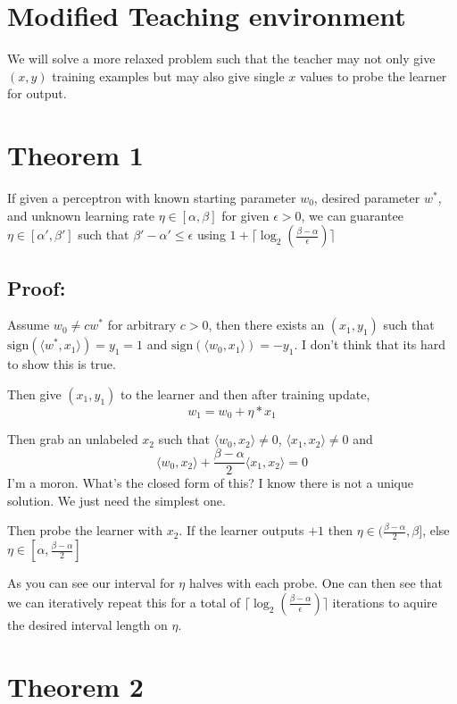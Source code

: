 \documentclass{article}
\begin{document}
\section*{Modified Teaching environment}
We will solve a more relaxed problem such that the teacher may not only give $(x,y)$ training examples but may also give single $x$ values to probe the learner for output. 

\section*{Theorem 1}
If given a perceptron with known starting parameter $w_0$, desired parameter $w^*$, and unknown learning rate $\eta \in [\alpha , \beta]$ for given $\epsilon > 0$, we can guarantee $\eta \in [\alpha', \beta']$ such that $\beta' - \alpha' \leq \epsilon$ using $1 + \lceil \log_2(\frac{\beta - \alpha}{\epsilon})\rceil$

\subsection*{Proof:}
Assume $w_0 \neq cw^*$ for arbitrary $c > 0$, then there exists an $(x_1, y_1)$ such that $\text{sign}(\langle w^*,x_1 \rangle) = y_1 = 1$ and $\text{sign}(\langle w_0,x_1 \rangle) = -y_1$.
\color{red}
I don't think that its hard to show this is true.
\color{black}

Then give $(x_1, y_1)$ to the learner and then after training update,
$$
w_1 = w_0 + \eta* x_1
$$

Then grab an unlabeled $x_2$ such that
$\langle w_0,x_2 \rangle \neq 0$, $\langle x_1, x_2 \rangle \neq 0$
and 
$$
\langle w_0,x_2 \rangle + \frac{\beta - \alpha}{2} \langle x_1, x_2 \rangle = 0
$$
\color{red}
I'm a moron. What's the closed form of this? I know there is not a unique solution. We just need the simplest one.
\color{black}

Then probe the learner with $x_2$. If the learner outputs $+1$ then
$\eta \in (\frac{\beta - \alpha}{2} , \beta]$, else 
$\eta \in [\alpha,\frac{\beta - \alpha}{2}]$

As you can see our interval for $\eta$ halves with each probe. One can then see that we can iteratively repeat this for a total of $ \lceil \log_2(\frac{\beta - \alpha}{\epsilon})\rceil$ iterations to aquire the desired interval length on $\eta$.


\section*{Theorem 2}
\color{red}
\end{document}
